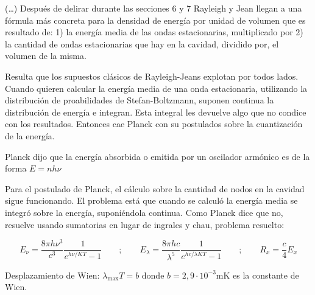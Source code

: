 \documentclass{article}
\begin{document}
(\ldots) Después de delirar durante las secciones 6 y 7 Rayleigh y Jean llegan a una fórmula más concreta para la densidad de energía por unidad de volumen que es resultado de: 1) la energía media de las ondas estacionarias, multiplicado por 2) la cantidad de ondas estacionarias que hay en la cavidad, dividido por, el volumen de la misma.

Resulta que los supuestos clásicos de Rayleigh-Jeans explotan por todos lados. Cuando quieren calcular la energía media de una onda estacionaria, utilizando la distribución de proabilidades de Stefan-Boltzmann, suponen continua la distribución de energía e integran. Esta integral les devuelve algo que no condice con los resultados. Entonces cae Planck con su postulados sobre la cuantización de la energía.

Planck dijo que la energía absorbida o emitida por un oscilador armónico es de la forma $E=nh\nu$

Para el postulado de Planck, el cálculo sobre la cantidad de nodos en la cavidad sigue funcionando. El problema está que cuando se calculó la energía media se integró sobre la energía, suponiéndola continua. Como Planck dice que no, resuelve usando sumatorias en lugar de ingrales y chau, problema resuelto:

\[ E_{\nu} = \frac{8 \pi h \nu^{3}}{c^{3}} \frac{1}{e^{h \nu / KT}-1} \qquad ; \qquad E_{\lambda} = \frac{8 \pi h c}{\lambda^{5}} \frac{1}{e^{h c / \lambda KT}-1} \qquad ; \qquad R_{x} = \frac{c}{4} E_{x} \]

Desplazamiento de Wien: $\lambda_{\textrm{max}}T=b$ donde $b=2,9 \cdot 10^{-3}\textrm{mK}$ es la constante de Wien.
\end{document}
